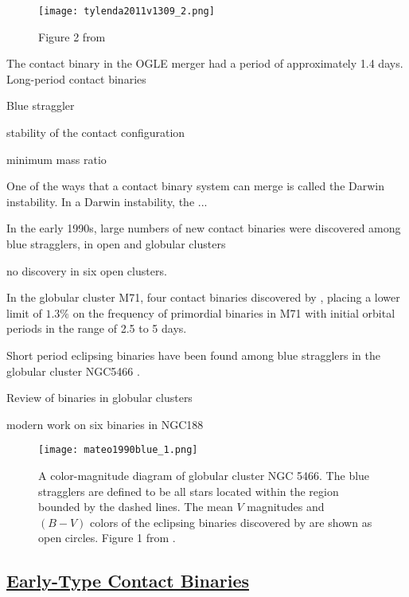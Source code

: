 \documentclass[12pt]{article} %
\numberwithin{equation}{section} %
\begin{document}
\begin{figure}[H]
\centering
\texttt{[image: tylenda2011v1309\_2.png]}
\caption{Figure 2 from \citet{tylenda2011v1309}}
\label{fig: tylenda2011v1309_2}
\end{figure}


The contact binary in the OGLE merger had a period of approximately 1.4 days. Long-period contact binaries \citep{rucinski1998eclipsing} 

Blue straggler \citet{andronov2006mergers}

stability of the contact configuration \citep{rasio1995minimum}

minimum mass ratio \citep{arbutina2009possible} \citep{arbutina2009}

One of the ways that a contact binary system can merge is called the Darwin instability. In a Darwin instability, the ...

In the early 1990s, large numbers of new contact binaries were discovered among blue stragglers, in open and globular clusters 

\citep{kaluzny1988ccd} no discovery in six open clusters.

In the globular cluster M71, four contact binaries discovered by \citet{yan1994primordial}, placing a lower limit of $1.3\%$ on the frequency of primordial binaries in M71 with initial orbital periods in the range of 2.5 to 5 days. 

Short period eclipsing binaries have been found among blue stragglers in the globular cluster NGC5466 \citep{mateo1990blue}.

Review of binaries in globular clusters \citep{hut1992binaries}

modern work on six binaries in NGC188 \citep{chen2016physical}

\begin{figure}[H]
\centering
\texttt{[image: mateo1990blue\_1.png]}
\caption{A color-magnitude diagram of globular cluster NGC 5466. The blue stragglers are defined to be all stars located within the region bounded by the dashed lines. The mean $V$ magnitudes and $(B - V)$ colors of the eclipsing binaries discovered by \citet{mateo1990blue} are shown as open circles. Figure 1 from \citet{mateo1990blue}.}
\label{fig: mateo1990blue_1}
\end{figure}

\subsection[Early-Type Contact Binaries]{\hyperlink{to}{Early-Type Contact Binaries}}
\end{document}
